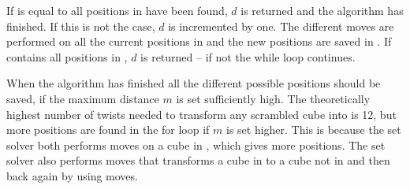 If  is equal to  all positions in  have been found, $d$ is returned and the algorithm has finished. 
If this is not the case, $d$ is incremented by one. 
The different  moves are performed on all the current  positions in  and the new  positions are saved in .
If  contains all positions in , $d$ is returned -- if not the while loop continues.



When the algorithm has finished all the different possible  positions should be saved, if the maximum distance $m$ is set sufficiently high. The theoretically highest number of twists needed to transform any scrambled cube into  is 12, but more positions are found in the for loop if $m$ is set higher. This is because the set solver both performs  moves on a cube in , which gives more  positions. The set solver also performs moves that transforms a cube in  to a cube not in  and then back again by using  moves.
